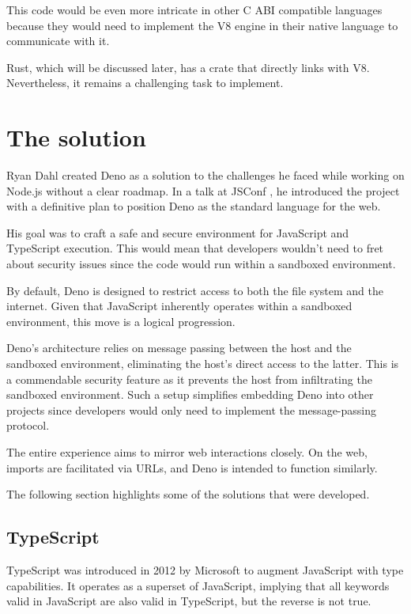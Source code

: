 \documentclass[10pt,journal,compsoc]{IEEEtran}
\begin{document}
This code would be even more intricate in other C ABI compatible languages because they would need to implement the V8 engine in their native language to communicate with it.

Rust, which will be discussed later, has a crate that directly links with V8. Nevertheless, it remains a challenging task to implement.

\section{The solution}

Ryan Dahl created Deno as a solution to the challenges he faced while working on Node.js without a clear roadmap. In a talk at JSConf \cite{FKNODE}, he introduced the project with a definitive plan to position Deno as the standard language for the web.

His goal was to craft a safe and secure environment for JavaScript and TypeScript execution. This would mean that developers wouldn't need to fret about security issues since the code would run within a sandboxed environment.

By default, Deno is designed to restrict access to both the file system and the internet. Given that JavaScript inherently operates within a sandboxed environment, this move is a logical progression.

Deno's architecture relies on message passing between the host and the sandboxed environment, eliminating the host's direct access to the latter. This is a commendable security feature as it prevents the host from infiltrating the sandboxed environment. Such a setup simplifies embedding Deno into other projects since developers would only need to implement the message-passing protocol.

The entire experience aims to mirror web interactions closely. On the web, imports are facilitated via URLs, and Deno is intended to function similarly.

The following section highlights some of the solutions that were developed.

\subsection{TypeScript}

TypeScript was introduced in 2012 by Microsoft to augment JavaScript with type capabilities. It operates as a superset of JavaScript, implying that all keywords valid in JavaScript are also valid in TypeScript, but the reverse is not true. \cite{TypeScript} \cite{10162220}
\end{document}
